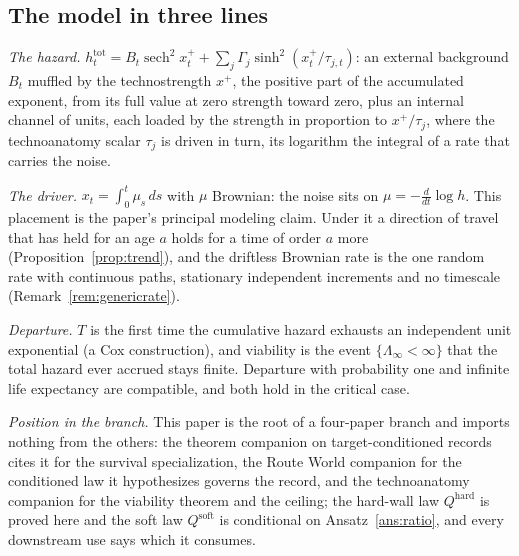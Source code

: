 \subsection{The model in three lines}
\emph{The hazard.}
$h^{\mathrm{tot}}_t=B_t\operatorname{sech}^2x_t^++\sum_j\Gamma_j\sinh^2(x_t^+/\tau_{j,t})$:
an external background $B_t$ muffled by the technostrength $x^+$, the
positive part of the accumulated exponent, from its full value at zero
strength toward zero, plus an internal channel of units, each loaded by
the strength in proportion to $x^+/\tau_j$, where the technoanatomy
scalar $\tau_j$ is driven in turn, its logarithm the integral of a rate
that carries the noise.

\emph{The driver.} $x_t=\int_0^t\mu_s\,ds$ with $\mu$ Brownian: the
noise sits on $\mu=-\frac{d}{dt}\log h$. This placement is the paper's
principal modeling claim. Under it a direction of travel that has held
for an age $a$ holds for a time of order $a$ more
(Proposition~\ref{prop:trend}), and the driftless Brownian rate is the one
random rate with continuous paths, stationary independent increments and
no timescale (Remark~\ref{rem:genericrate}).

\emph{Departure.} $T$ is the first time the cumulative hazard exhausts
an independent unit exponential (a Cox construction), and viability is
the event $\{\Lambda_\infty<\infty\}$ that the total hazard ever
accrued stays finite. Departure with probability one and infinite life
expectancy are compatible, and both hold in the critical case.

\emph{Position in the branch.} This paper is the root of a four-paper
branch and imports nothing from the others: the theorem companion on
target-conditioned records cites it for the survival specialization,
the Route World companion for the conditioned law it hypothesizes
governs the record, and the technoanatomy companion for the viability
theorem and the ceiling; the hard-wall law $Q^{\mathrm{hard}}$ is
proved here and the soft law $Q^{\mathrm{soft}}$ is conditional on
Ansatz~\ref{ans:ratio}, and every downstream use says which it consumes.

